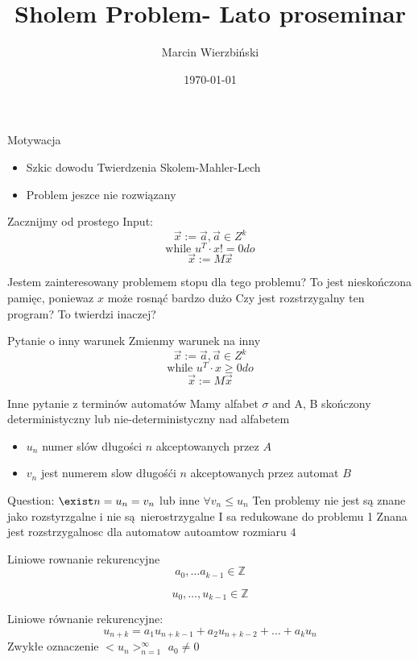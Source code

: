 \documentclass{beamer}
\title{Sholem Problem- Lato proseminar}
\author{Marcin Wierzbiński}
\institute{MIMUW}
\date{\today}
\theoremstyle{definition}
\begin{document}
\frame{\titlepage}

\begin{frame}{Motywacja}
\begin{itemize}
    \item Szkic dowodu Twierdzenia Skolem-Mahler-Lech
    \item Problem jeszce nie rozwiązany
\end{itemize}
\end{frame}
    
\begin{frame}{Zacznijmy od prostego}
    Input: 
    $$\vec{x} := \vec{a}, \vec{a} \in Z^{k}$$
    $$\text{while } u^{T}\cdot x != 0 do$$
    $$ \vec{x} := M \vec{x}$$

    Jestem zainteresowany problemem stopu dla tego problemu? To jest nieskończona pamięc, poniewaz $x$ może rosnąć bardzo dużo
    Czy jest rozstrzygalny ten program? To twierdzi inaczej?
    
    
\end{frame}
    
\begin{frame}{Pytanie o inny warunek}
        Zmienmy warunek na inny 
    $$\vec{x} := \vec{a}, \vec{a} \in Z^{k}$$
    $$\text{while } u^{T}\cdot x \geq  0 do$$
    $$ \vec{x} := M \vec{x}$$
    
\end{frame}    

\begin{frame}{Inne pytanie z terminów automatów}
    Mamy alfabet $\sigma$ and A, B skończony deterministyczny lub nie-deterministyczny nad alfabetem 
    \begin{itemize}
        \item $u_n$ numer slów długości $n$ akceptowanych przez $A$
        \item  $v_n$ jest numerem slow długośći $n$ akceptowanych przez automat $B$

    \end{itemize}
    Question:
    $\exist n = u_n = v_n$
    lub inne 
    $\forall v_n \leq u_n$
    Ten problemy nie jest są znane jako rozstyrzgalne i nie są nierostrzygalne
    I sa redukowane do problemu 1
    Znana jest rozstrzygalnosc dla automatow autoamtow rozmiaru $4$
    
\end{frame}

\begin{frame}{Liniowe rownanie rekurencyjne}
    $$
        a_0, \ldots a_{k-1} \in \mathbb{Z} 
    $$
    
    $$
        u_0, \ldots, u_{k-1} \in \mathbb{Z}
    $$
    
    
    Liniowe równanie rekurencyjne: 
    $$
    u_{n+k}=a_{1} u_{n+k-1}+a_{2} u_{n+k-2}+\ldots+a_{k} u_{n}
    $$
    Zwykłe oznaczenie $<u_n>_{n=1}^{\infty}$
    $a_0 \neq 0$
\end{frame}
\end{document}
